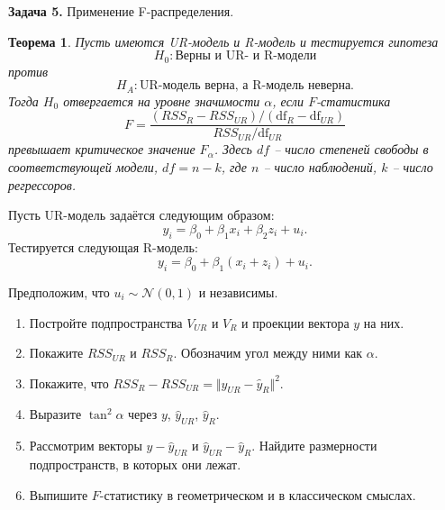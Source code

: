 \documentclass[10pt, a4paper]{extarticle}
\newtheorem{theor}{Теорема}
\begin{document}
	{\Large \textbf{Задача 5.} Применение F-распределения.}
	\begin{theor}
		Пусть имеются UR-модель и R-модель и тестируется гипотеза 
		\[
		H_0: \text{Верны и UR- и R-модели}
		\]
		против
		\[
		H_A: \text{UR-модель верна, а R-модель неверна.}
		\]
		Тогда $H_0$ отвергается на уровне значимости $\alpha$, если $F$-статистика
		\[
		F = \dfrac{(RSS_{R} - RSS_{UR})/(\text{df}_{R} - \text{df}_{UR})}{RSS_{UR} / \text{df}_{UR}}
		\]
		превышает критическое значение $F_{\alpha}$. Здесь $df$ -- число степеней свободы в соответствующей модели, $df = n - k$, где $n$ -- число наблюдений, $k$ -- число регрессоров. 
	\end{theor}
	
	Пусть UR-модель задаётся следующим образом:
	\[
	y_i = \beta_0 + \beta_1x_i + \beta_2z_i + u_i.
	\]
	Тестируется следующая R-модель:
	\[
	y_i = \beta_0 + \beta_1(x_i + z_i) + u_i.
	\]
	
	Предположим, что $u_i \sim \mathcal{N}(0, 1)$ и независимы.
	
	\begin{enumerate}[label=\textbf{\alph*)}]
		\item Постройте подпространства $V_{UR}$ и $V_{R}$ и проекции вектора $y$ на них.
		\item Покажите $RSS_{UR}$ и $RSS_{R}$. Обозначим угол между ними как $\alpha$.
		\item Покажите, что $RSS_{R} - RSS_{UR} = \Vert \hat{y}_{UR} - \hat{y}_{R} \Vert^2$.
		\item Выразите $\tan^2 \alpha$ через $y$,  $\hat{y}_{UR}$, $\hat{y}_{R}$.
		\item Рассмотрим векторы $y - \hat{y}_{UR}$ и $\hat{y}_{UR} - \hat{y}_{R}$. Найдите размерности подпространств, в которых они лежат. 
		\item Выпишите $F$-статистику в геометрическом и в классическом смыслах.
	\end{enumerate}
	
\end{document}
